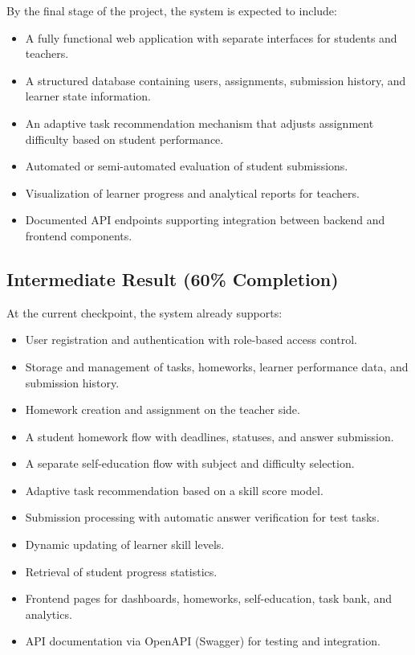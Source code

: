 \documentclass[a4paper,12pt]{extarticle}
\begin{document}
By the final stage of the project, the system is expected to include:

\begin{itemize}
    \item A fully functional web application with separate interfaces for students and teachers.
    \item A structured database containing users, assignments, submission history, and learner state information.
    \item An adaptive task recommendation mechanism that adjusts assignment difficulty based on student performance.
    \item Automated or semi-automated evaluation of student submissions.
    \item Visualization of learner progress and analytical reports for teachers.
    \item Documented API endpoints supporting integration between backend and frontend components.
\end{itemize}

\subsection*{Intermediate Result (60\% Completion)}

At the current checkpoint, the system already supports:

\begin{itemize}
    \item User registration and authentication with role-based access control.
    \item Storage and management of tasks, homeworks, learner performance data, and submission history.
    \item Homework creation and assignment on the teacher side.
    \item A student homework flow with deadlines, statuses, and answer submission.
    \item A separate self-education flow with subject and difficulty selection.
    \item Adaptive task recommendation based on a skill score model.
    \item Submission processing with automatic answer verification for test tasks.
    \item Dynamic updating of learner skill levels.
    \item Retrieval of student progress statistics.
    \item Frontend pages for dashboards, homeworks, self-education, task bank, and analytics.
    \item API documentation via OpenAPI (Swagger) for testing and integration.
\end{itemize}
\end{document}
